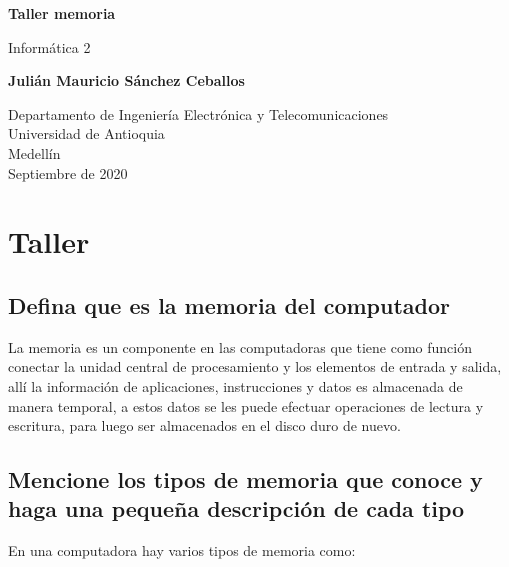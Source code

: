 \documentclass{article}
\begin{document}
\begin{titlepage}
    \begin{center}
        \vspace*{1cm}
            
        \Huge
        \textbf{Taller memoria}
            
        \vspace{0.5cm}
        \LARGE
        Informática 2
            
        \vspace{1.5cm}
            
        \textbf{Julián Mauricio Sánchez Ceballos}
            
        \vfill
            
        \vspace{0.8cm}
            
        \Large
        Departamento de Ingeniería Electrónica y Telecomunicaciones\\
        Universidad de Antioquia\\
        Medellín\\
        Septiembre de 2020
            
    \end{center}
\end{titlepage}



\section{Taller} \label{taller}

    \subsection{Defina que es la memoria del computador}
    La memoria es un componente en las computadoras que tiene como función conectar la unidad central de procesamiento y los elementos de entrada y salida, allí  la información de aplicaciones, instrucciones y datos es almacenada de manera temporal, a estos datos se les puede efectuar operaciones de lectura y escritura, para luego ser almacenados en el disco duro de nuevo. 
    
    \subsection{Mencione los tipos de memoria que conoce y haga una pequeña descripción de cada tipo}
    En una computadora hay varios tipos de memoria como: 
    
\end{document}
